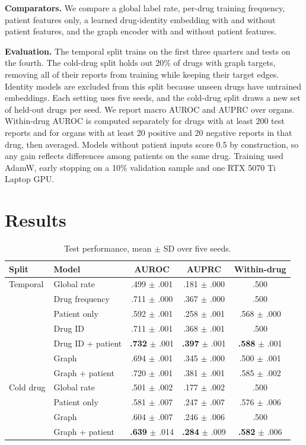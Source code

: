 \documentclass[conference,a4paper]{IEEEtran}
\begin{document}
\textbf{Comparators.} We compare a global label rate, per-drug training frequency, patient features only, a learned drug-identity embedding with and without patient features, and the graph encoder with and without patient features.

\textbf{Evaluation.} The temporal split trains on the first three quarters and tests on the fourth. The cold-drug split holds out 20\% of drugs with graph targets, removing all of their reports from training while keeping their target edges. Identity models are excluded from this split because unseen drugs have untrained embeddings. Each setting uses five seeds, and the cold-drug split draws a new set of held-out drugs per seed. We report macro AUROC and AUPRC over organs. Within-drug AUROC is computed separately for drugs with at least 200 test reports and for organs with at least 20 positive and 20 negative reports in that drug, then averaged. Models without patient inputs score 0.5 by construction, so any gain reflects differences among patients on the same drug. Training used AdamW, early stopping on a 10\% validation sample and one RTX 5070 Ti Laptop GPU.

\section{Results}
\begin{table}[t]
\centering
\caption{Test performance, mean $\pm$ SD over five seeds.}
\label{tab:main}
\setlength{\tabcolsep}{3pt}
\begin{tabular}{llccc}
\toprule
Split & Model & AUROC & AUPRC & Within-drug \\
\midrule
Temporal & Global rate & .499 $\pm$ .001 & .181 $\pm$ .000 & .500 \\
 & Drug frequency & .711 $\pm$ .000 & .367 $\pm$ .000 & .500 \\
 & Patient only & .592 $\pm$ .001 & .258 $\pm$ .001 & .568 $\pm$ .000 \\
 & Drug ID & .711 $\pm$ .001 & .368 $\pm$ .001 & .500 \\
 & Drug ID + patient & \textbf{.732} $\pm$ .001 & \textbf{.397} $\pm$ .001 & \textbf{.588} $\pm$ .001 \\
 & Graph & .694 $\pm$ .001 & .345 $\pm$ .000 & .500 $\pm$ .001 \\
 & Graph + patient & .720 $\pm$ .001 & .381 $\pm$ .001 & .585 $\pm$ .002 \\
\midrule
Cold drug & Global rate & .501 $\pm$ .002 & .177 $\pm$ .002 & .500 \\
 & Patient only & .581 $\pm$ .007 & .247 $\pm$ .007 & .576 $\pm$ .006 \\
 & Graph & .604 $\pm$ .007 & .246 $\pm$ .006 & .500 \\
 & Graph + patient & \textbf{.639} $\pm$ .014 & \textbf{.284} $\pm$ .009 & \textbf{.582} $\pm$ .006 \\
\bottomrule
\end{tabular}
\end{table}
\end{document}
